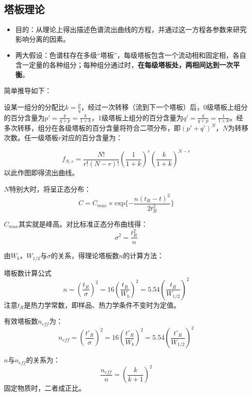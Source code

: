\subsection{塔板理论}
\begin{itemize}
	\item 目的：从理论上得出描述色谱流出曲线的方程，并通过这一方程各参数来研究影响分离的因素。
	\item 两大假设：色谱柱存在多级“塔板”，每级塔板包含一个流动相和固定相，各自含一定量的各种组分；每种组分通过时，\textbf{在每级塔板处，两相间达到一次平衡}。
\end{itemize}

简单推导如下：

设某一组分的分配比$k=\frac{p}{q}$，经过一次转移（流到下一个塔板）后，0级塔板上组分的百分含量为$p'=\frac{p}{q+p}=\frac{k}{1+k}$，1级塔板上组分的百分含量为$q'=\frac{q}{q+p}=\frac{1}{1+k}$。经多次转移，组分在各级塔板的百分含量将符合二项分布，即${(p'+q')^N}$，$N$为转移次数。任一级塔板$r$对应的百分含量为：

\begin{equation*}
	f_{N,r}=\dfrac{N!}{r!(N-r)!} {(\dfrac{1}{1+k})}^r {(\dfrac{k}{1+k})}^{N-r}
\end{equation*}
以此作图即得流出曲线。

$N$特别大时，将呈正态分布：
\begin{equation*}
	C=C_{max}\times \mathrm{exp}\{-\dfrac{n(t_R-t)^2}{2t_R^2}\}
\end{equation*}

$C_{max}$其实就是峰高。对比标准正态分布曲线得：
\begin{equation*}
	{\sigma}^2=\dfrac{t_R^2}{n}
\end{equation*}

由$W_b$，$W_{1/2}$与$\sigma$的关系，得理论塔板数$n$的计算方法：

\begin{theorem*}{塔板数计算公式}{}
	\begin{equation}
	n={\left(\dfrac{t_R}{\sigma}\right)}^2=16{\left(\dfrac{t_R}{W_b}\right)}^2=5.54{\left(\dfrac{t_R}{W_{1/2}}\right)}^2\label{eqn:1.2}
	\end{equation}
	注意$t_R$是热力学常数，即样品、热力学条件不变时为定值。
	
	有效塔板数$n_{eff}$为：
	\begin{equation*}
	n_{eff}={\left(\dfrac{t'_R}{\sigma}\right)}^2=16{\left(\dfrac{t'_R}{W_b}\right)}^2=5.54{\left(\dfrac{t'_R}{W_{1/2}}\right)}^2
	\end{equation*}
	
	$n$与$n_{eff}$的关系为：
	\begin{equation}
		\dfrac{n_{eff}}{n}={\left(\dfrac{k}{k+1}\right)}^2
	\end{equation}
	固定物质时，二者成正比。
\end{theorem*}

